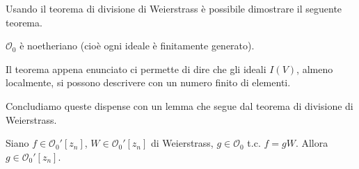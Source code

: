 Usando il teorema di divisione di Weierstrass è possibile dimostrare il seguente teorema.

\begin{thm}
  $\mathcal{O}_0$ è noetheriano (cioè ogni ideale è finitamente generato).
\end{thm}

\begin{oss}
  Il teorema appena enunciato ci permette di dire che gli ideali $I(V)$, almeno localmente, si possono descrivere con un numero finito di elementi.
\end{oss}

Concludiamo queste dispense con un lemma che segue dal teorema di divisione di Weierstrass.

\begin{lm}
  Siano $f \in \mathcal{O}_0'[z_n]$, $W \in \mathcal{O}_0'[z_n]$ di Weierstrass, $g \in \mathcal{O}_0$ t.c. $f=gW$. Allora $g \in \mathcal{O}_0'[z_n]$.
\end{lm}
